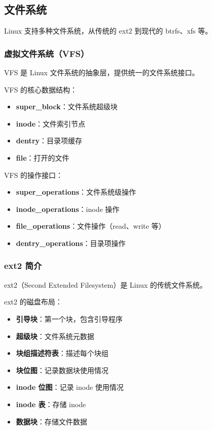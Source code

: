 \subsection{文件系统}

Linux 支持多种文件系统，从传统的 ext2 到现代的 btrfs、xfs 等。

\subsubsection{虚拟文件系统（VFS）}


VFS 是 Linux 文件系统的抽象层，提供统一的文件系统接口。

VFS 的核心数据结构：
\begin{itemize}
  \item \textbf{super\_block}：文件系统超级块
  \item \textbf{inode}：文件索引节点
  \item \textbf{dentry}：目录项缓存
  \item \textbf{file}：打开的文件
\end{itemize}

VFS 的操作接口：
\begin{itemize}
  \item \textbf{super\_operations}：文件系统级操作
  \item \textbf{inode\_operations}：inode 操作
  \item \textbf{file\_operations}：文件操作（read、write 等）
  \item \textbf{dentry\_operations}：目录项操作
\end{itemize}

\subsubsection{ext2 简介}

ext2（Second Extended Filesystem）是 Linux 的传统文件系统。

ext2 的磁盘布局：
\begin{itemize}
  \item \textbf{引导块}：第一个块，包含引导程序
  \item \textbf{超级块}：文件系统元数据
  \item \textbf{块组描述符表}：描述每个块组
  \item \textbf{块位图}：记录数据块使用情况
  \item \textbf{inode 位图}：记录 inode 使用情况
  \item \textbf{inode 表}：存储 inode
  \item \textbf{数据块}：存储文件数据
\end{itemize}

